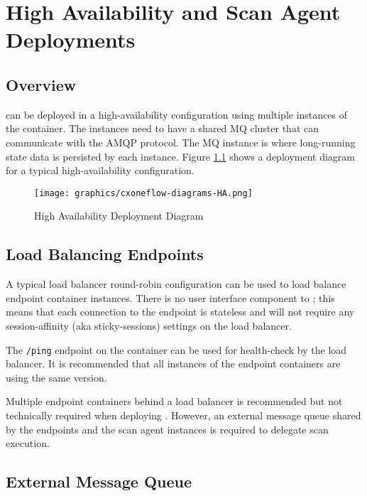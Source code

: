 \chapter{High Availability and Scan Agent Deployments}
\label{sec:high-availability}

\section{Overview}

\cxoneflow can be deployed in a high-availability configuration using multiple instances of
the \cxoneflow container.  The \cxoneflow instances need to have a shared MQ cluster that
can communicate with the AMQP protocol.  The MQ instance is where long-running state data
is persisted by each instance.  Figure \ref{fig:ha-diagram} shows a deployment diagram for
a typical high-availability configuration.


\begin{figure}[h]
    \texttt{[image: graphics/cxoneflow-diagrams-HA.png]}
    \caption{High Availability Deployment Diagram}
    \label{fig:ha-diagram}
\end{figure}


\section{Load Balancing \cxoneflowtext\space Endpoints}

A typical load balancer round-robin configuration can be used to load balance \cxoneflow endpoint container instances.
There is no user interface component to \cxoneflow; this means that each connection to the \cxoneflow endpoint is stateless
and will not require any session-affinity (aka sticky-sessions) settings on the load balancer.

The \texttt{/ping} endpoint on the \cxoneflow container can be used for health-check by the load balancer.  
It is recommended that all instances of the \cxoneflow endpoint containers are using the same version.

Multiple \cxoneflow endpoint containers behind a load balancer is recommended but not technically required
when deploying .  However, an external message queue shared by the \cxoneflow endpoints
and the scan agent instances is required to delegate scan execution.  

\section{External Message Queue}\label{sec:external-mq}

